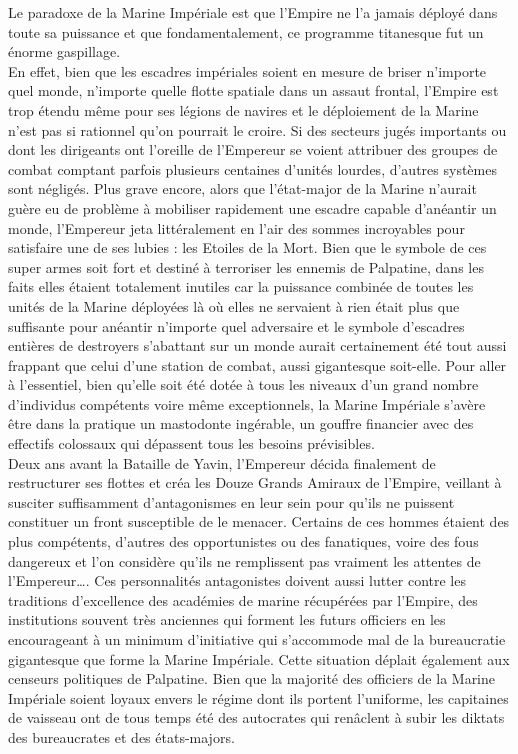 \documentclass[twoside]{article}
\begin{document}
Le paradoxe de la Marine Impériale est que l'Empire ne l'a jamais déployé dans toute sa puissance et que fondamentalement, ce programme titanesque fut un énorme gaspillage.\\

En effet, bien que les escadres impériales soient en mesure de briser n'importe quel monde, n'importe quelle flotte spatiale dans un assaut frontal, l'Empire est trop étendu même pour ses légions de navires et le déploiement de la Marine n'est pas si rationnel qu'on pourrait le croire. Si des secteurs jugés importants ou dont les dirigeants ont l'oreille de l'Empereur se voient attribuer des groupes de combat comptant parfois plusieurs centaines d'unités lourdes, d'autres systèmes sont négligés. Plus grave encore, alors que l'état-major de la Marine n'aurait guère eu de problème à mobiliser rapidement une escadre capable d'anéantir un monde, l'Empereur jeta littéralement en l'air des sommes incroyables pour satisfaire une de ses lubies : les Etoiles de la Mort. Bien que le symbole de ces super armes soit fort et destiné à terroriser les ennemis de Palpatine, dans les faits elles étaient totalement inutiles car la puissance combinée de toutes les unités de la Marine déployées là où elles ne servaient à rien était plus que suffisante pour anéantir n'importe quel adversaire et le symbole d'escadres entières de destroyers s'abattant sur un monde aurait certainement été tout aussi frappant que celui d'une station de combat, aussi gigantesque soit-elle.
Pour aller à l'essentiel, bien qu'elle soit été dotée à tous les niveaux d'un grand nombre d'individus compétents voire même exceptionnels, la Marine Impériale s'avère être dans la pratique un mastodonte ingérable, un gouffre financier avec des effectifs colossaux qui dépassent tous les besoins prévisibles.\\

Deux ans avant la Bataille de Yavin, l'Empereur décida finalement de restructurer ses flottes et créa les Douze Grands Amiraux de l'Empire, veillant à susciter suffisamment d'antagonismes en leur sein pour qu'ils ne puissent constituer un front susceptible de le menacer. Certains de ces hommes étaient des plus compétents, d'autres des opportunistes ou des fanatiques, voire des fous dangereux et l'on considère qu'ils ne remplissent pas vraiment les attentes de l'Empereur\ldots. Ces personnalités antagonistes doivent aussi lutter contre les traditions d'excellence des académies de marine récupérées par l'Empire, des institutions souvent très anciennes qui forment les futurs officiers en les encourageant à un minimum d'initiative qui s'accommode mal de la bureaucratie gigantesque que forme la Marine Impériale. Cette situation déplait également aux censeurs politiques de Palpatine. Bien que la majorité des officiers de la Marine Impériale soient loyaux envers le régime dont ils portent l'uniforme, les capitaines de vaisseau ont de tous temps été des autocrates qui renâclent à subir les diktats des bureaucrates et des états-majors.\\
\end{document}

